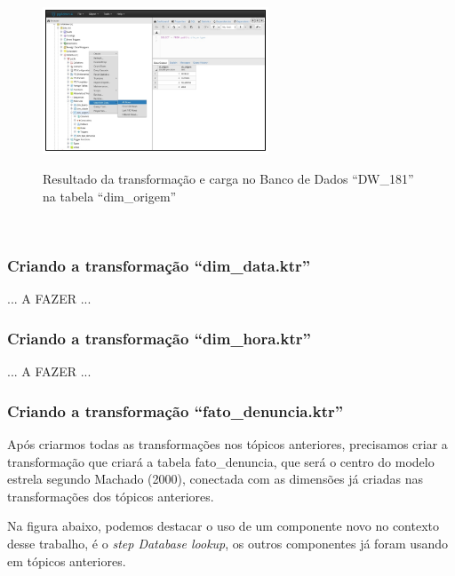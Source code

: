\begin{figure}[H]
	\vspace*{0,2cm}
    \centering
    \caption{Resultado da transformação e carga no Banco de Dados ``DW\_181'' na tabela ``dim\_origem''}
    \includegraphics[width=0.6\textwidth]{./04-figuras/figura-res-dim-origem}
    \label{fig:ilustfigresdimorigem}
\end{figure}
\vspace*{-0,9cm}
{\raggedright {}} \\

\subsubsection{Criando a transforma\c{c}\~{a}o ``dim\_data.ktr''}

... A FAZER ...

\subsubsection{Criando a transforma\c{c}\~{a}o ``dim\_hora.ktr''}

... A FAZER ...

\subsubsection{Criando a transforma\c{c}\~{a}o ``fato\_denuncia.ktr''}

Ap\'os criarmos todas as transforma\c{c}\~{o}es nos t\'opicos anteriores, precisamos criar a transforma\c{c}\~{a}o que criar\'{a} a tabela fato\_denuncia, que ser\'{a} o centro do modelo estrela segundo Machado (2000), conectada com as dimens\~{o}es j\'{a} criadas nas transforma\c{c}\~{o}es dos t\'opicos anteriores.

Na figura abaixo, podemos destacar o uso de um componente novo no contexto desse trabalho, \'{e} o \textit{step Database lookup}, os outros componentes j\'{a} foram usando em t\'opicos anteriores.

